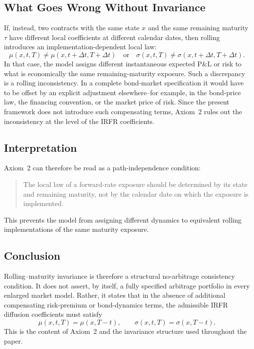 \documentclass[12pt]{article}
\theoremstyle{statementstyle}
\begin{document}
\begin{appendices}
\subsection{What Goes Wrong Without Invariance}
\label{D.5}

If, instead, two contracts with the same state \(x\) and the same remaining
maturity \(\tau\) have different local coefficients at different calendar dates,
then rolling introduces an implementation-dependent local law:
\[
\mu(x,t,T)\neq \mu(x,t+\Delta t,T+\Delta t)
\quad\text{or}\quad
\sigma(x,t,T)\neq \sigma(x,t+\Delta t,T+\Delta t).
\]
In that case, the model assigns different instantaneous expected P\&L or risk to
what is economically the same remaining-maturity exposure. Such a discrepancy is
a rolling inconsistency. In a complete bond-market specification it would have to
be offset by an explicit adjustment elsewhere--for example, in the bond-price
law, the financing convention, or the market price of risk. Since the present
framework does not introduce such compensating terms, Axiom~2 rules out the
inconsistency at the level of the IRFR coefficients.

\subsection{Interpretation}
\label{D.6}

Axiom~2 can therefore be read as a path-independence condition:
\begin{quote}
The local law of a forward-rate exposure should be determined by its state and
remaining maturity, not by the calendar date on which the exposure is implemented.
\end{quote}
This prevents the model from assigning different dynamics to equivalent rolling
implementations of the same maturity exposure.

\subsection{Conclusion}
\label{D.7}

Rolling--maturity invariance is therefore a structural no-arbitrage consistency
condition. It does not assert, by itself, a fully specified arbitrage portfolio in
every enlarged market model. Rather, it states that in the absence of additional
compensating risk-premium or bond-dynamics terms, the admissible IRFR diffusion
coefficients must satisfy
\[
\mu(x,t,T)=\mu(x,T-t),
\qquad
\sigma(x,t,T)=\sigma(x,T-t).
\]
This is the content of Axiom~2 and the invariance structure used throughout the
paper.

\end{appendices}
\end{document}

